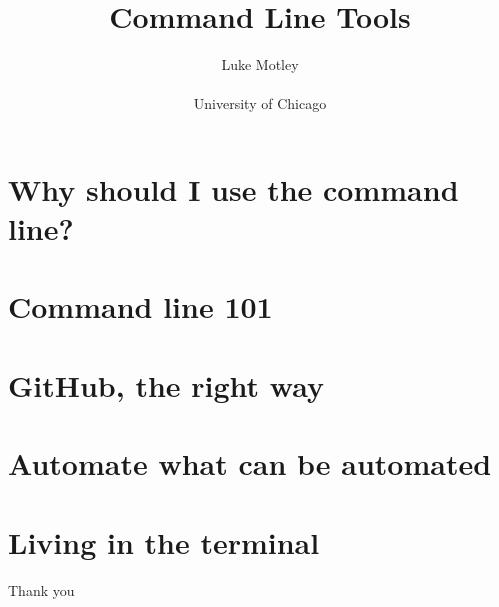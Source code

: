 \documentclass[12pt,notes=hide,aspectratio=169,mathserif,hyperref={colorlinks=true}]{beamer}
\title{Command Line Tools}
\author[Motley]{
Luke Motley \\
\\[1.0em]
{University of Chicago}
}
\date{{\color{blue}\monthname[\the\month] \the\year}}
\begin{document}
\begin{frame}[plain]
\setcounter{framenumber}{0}
\titlepage
\end{frame}
\section*{Why should I use the command line?}

\section{Command line 101}

\section{GitHub, the right way}

\section{Automate what can be automated}

\section{Living in the terminal}

%



\begin{frame}[plain] \begin{center}{\LARGE Thank you}\end{center} \end{frame}


\end{document}
